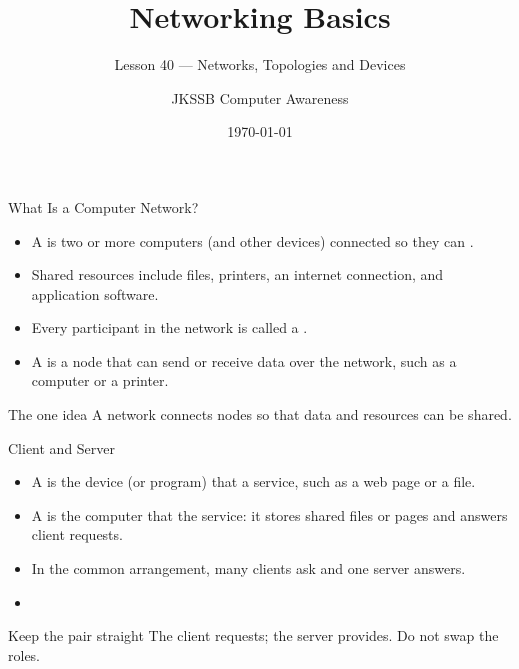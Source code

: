 \documentclass[aspectratio=169]{beamer}
\title{Networking Basics}
\subtitle{Lesson 40 --- Networks, Topologies and Devices}
\author{JKSSB Computer Awareness}
\date{\today}
\begin{document}
\frame{\titlepage}

\begin{frame}{What Is a Computer Network?}
  \begin{itemize}
    \item A  is two or more computers (and other
      devices) connected so they can .
    \item Shared resources include files, printers, an internet connection,
      and application software.
    \item Every participant in the network is called a .
    \item A  is a node that can send or receive data over the
      network, such as a computer or a printer.
  \end{itemize}
  \begin{block}{The one idea}
    A network connects nodes so that data and resources can be shared.
  \end{block}
\end{frame}

\begin{frame}{Client and Server}
  \begin{itemize}
    \item A  is the device (or program) that  a
      service, such as a web page or a file.
    \item A  is the computer that  the service:
      it stores shared files or pages and answers client requests.
    \item In the common  arrangement, many clients ask and
      one server answers.
    \item {}
  \end{itemize}
  \begin{block}{Keep the pair straight}
    The client requests; the server provides. Do not swap the roles.
  \end{block}
\end{frame}
\end{document}

